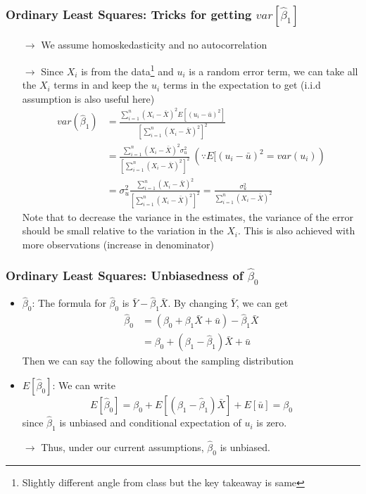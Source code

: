 \documentclass[aspectratio=169]{beamer}
\begin{document}
\begin{frame}
\frametitle{Ordinary Least Squares: Tricks for getting $var[\hat{\beta}_1]$}
\begin{itemize}
\item[$\to$] We assume homoskedasticity and no autocorrelation
\item[$\to$] Since $X_i$ is from the data\footnote{Slightly different angle from class but the key takeaway is same} and $u_i$ is a random error term, we can take all the $X_i$ terms in and keep the $u_i$ terms in the expectation to get (i.i.d assumption is also useful here)
\[
\begin{aligned}
var(\hat{\beta}_1)&=\frac{\sum_{i=1}^n(X_i-\bar{X})^2E[(u_i-\bar{u})^2]}{[\sum_{i=1}^n(X_i-\bar{X})^2]^2}\\
&=\frac{\sum_{i=1}^n(X_i-\bar{X})^2\sigma_u^2}{[\sum_{i=1}^n(X_i-\bar{X})^2]^2} \ (\because E[(u_i-\bar{u})^2=var(u_i))\\
&=\sigma_u^2\frac{\sum_{i=1}^n(X_i-\bar{X})^2}{[\sum_{i=1}^n(X_i-\bar{X})^2]^2} =\frac{\sigma_u^2}{\sum_{i=1}^n(X_i-\bar{X})^2}
\end{aligned}
\]
Note that  to decrease the variance in the estimates, the variance of the error should be small relative to the variation in the $X_i$. This is also achieved with more observations (increase in denominator)
\end{itemize}
\end{frame}

\begin{frame}
\frametitle{Ordinary Least Squares: Unbiasedness of $\hat{\beta}_0$}
\begin{itemize}
\item $\hat{\beta}_0$: The formula for $\hat{\beta}_0$ is $\bar{Y}-\hat{\beta}_1\bar{X}$. By changing $\bar{Y}$, we can get
\[
\begin{aligned}
\hat{\beta}_0&=(\beta_0+\beta_1\bar{X}+\bar{u})-\hat{\beta}_1\bar{X}\\
&=\beta_0+(\beta_1-\hat{\beta}_1)\bar{X}+\bar{u}
\end{aligned}
\]
Then we can say the following about the sampling distribution
\item $E[\hat{\beta}_0]$: We can write
\[
E[\hat{\beta}_0]=\beta_0+E[(\beta_1-\hat{\beta}_1)\bar{X}]+E[\bar{u}]=\beta_0
\]
since $\hat{\beta}_1$ is unbiased and conditional expectation of $u_i$ is zero. 
\item[$\to$]Thus, under our current assumptions, $\hat{\beta}_0$ is unbiased. 
\end{itemize}
\end{frame}
\end{document}

